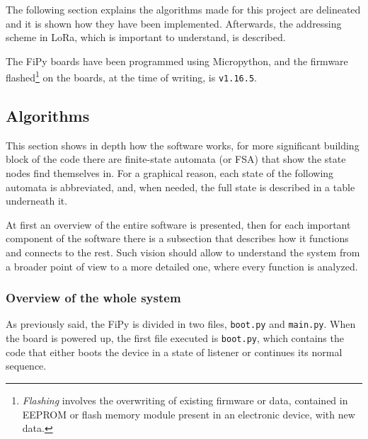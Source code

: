 		The following section explains the algorithms made for this project are delineated and it is shown how they have been implemented.
		Afterwards, the addressing scheme in LoRa, which is important to understand, is described.
		
		The FiPy boards have been programmed using Micropython, and the firmware flashed\footnote{ \textit{Flashing} involves the overwriting of existing firmware or data, contained in EEPROM or flash memory module present in an electronic device, with new data.} on the boards, at the time of writing, is \texttt{v1.16.5}.
		
		\subsection{Algorithms}\label{subsec:algorithms}
	
			

			This section shows in depth how the software works, for more significant building block of the code there are finite-state automata (or FSA) that show the state nodes find themselves in.
			For a graphical reason, each state of the following automata is abbreviated, and, when needed, the full state is described in a table underneath it.
			
			At first an overview of the entire software is presented, then for each important component of the software there is a subsection that describes how it functions and connects to the rest.
			Such vision should allow to understand the system from a broader point of view to a more detailed one, where every function is analyzed.
			
			\newpage
			\subsubsection{Overview of the whole system}
			
				As previously said, the FiPy is divided in two files, \texttt{boot.py} and \texttt{main.py}.
				When the board is powered up, the first file executed is \texttt{boot.py}, which contains the code that either boots the device in a state of listener or continues its normal sequence.
				
